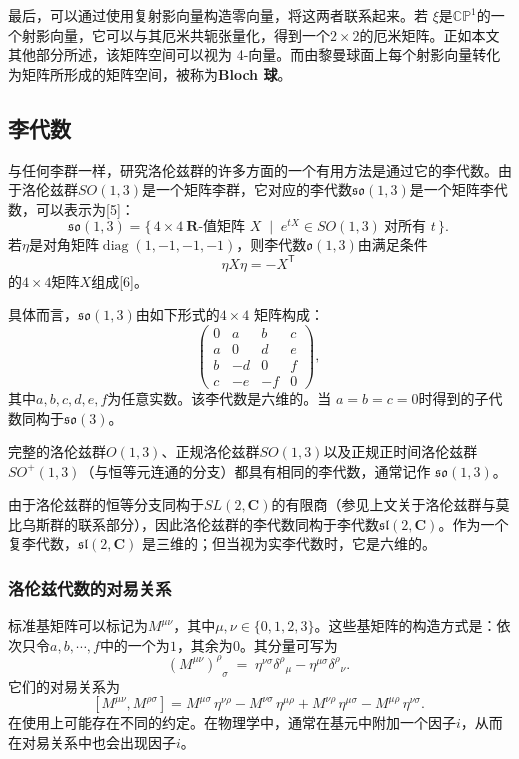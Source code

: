 最后，可以通过使用复射影向量构造零向量，将这两者联系起来。若 $\xi$是$\mathbb{CP}^{1}$的一个射影向量，它可以与其厄米共轭张量化，得到一个$2 \times 2$的厄米矩阵。正如本文其他部分所述，该矩阵空间可以视为 4-向量。而由黎曼球面上每个射影向量转化为矩阵所形成的矩阵空间，被称为\textbf{Bloch 球}。
\subsection{李代数}
与任何李群一样，研究洛伦兹群的许多方面的一个有用方法是通过它的李代数。由于洛伦兹群$SO(1,3)$是一个矩阵李群，它对应的李代数$\mathfrak{so}(1,3)$是一个矩阵李代数，可以表示为[5]：
\[
\mathfrak{so}(1,3) = \{\, 4\times 4 \ \mathbf{R}\text{-值矩阵 } X \;\mid\; e^{tX} \in SO(1,3) \ \text{对所有 } t \,\}.~
\]
若$\eta$是对角矩阵$\operatorname{diag}(1,-1,-1,-1)$，则李代数$\mathfrak{o}(1,3)$由满足条件
\[
\eta X \eta = -X^{\textsf{T}}~
\]
的$4 \times 4$矩阵$X$组成[6]。

具体而言，$\mathfrak{so}(1,3)$由如下形式的$4\times 4$ 矩阵构成：
\[
\begin{pmatrix}
0 & a & b & c \\
a & 0 & d & e \\
b & -d & 0 & f \\
c & -e & -f & 0
\end{pmatrix},~
\]
其中$a,b,c,d,e,f$为任意实数。该李代数是六维的。当 $a=b=c=0$时得到的子代数同构于$\mathfrak{so}(3)$。

完整的洛伦兹群$O(1,3)$、正规洛伦兹群$SO(1,3)$以及正规正时间洛伦兹群$SO^{+}(1,3)$（与恒等元连通的分支）都具有相同的李代数，通常记作 $\mathfrak{so}(1,3)$。

由于洛伦兹群的恒等分支同构于$SL(2,\mathbf{C})$的有限商（参见上文关于洛伦兹群与莫比乌斯群的联系部分），因此洛伦兹群的李代数同构于李代数$\mathfrak{sl}(2,\mathbf{C})$。作为一个复李代数，$\mathfrak{sl}(2,\mathbf{C})$ 是三维的；但当视为实李代数时，它是六维的。
\subsubsection{洛伦兹代数的对易关系}
标准基矩阵可以标记为$M^{\mu \nu}$，其中$\mu,\nu \in \{0,1,2,3\}$。这些基矩阵的构造方式是：依次只令$a,b,\cdots,f$中的一个为$1$，其余为$0$。其分量可写为
\[
{(M^{\mu \nu})^{\rho}}_{\sigma} \;=\; \eta^{\nu \sigma} {\delta^{\rho}}_{\mu} - \eta^{\mu \sigma} {\delta^{\rho}}_{\nu}.~
\]
它们的对易关系为
\[
[M^{\mu \nu}, M^{\rho \sigma}] 
= M^{\mu \sigma}\,\eta^{\nu \rho} 
- M^{\nu \sigma}\,\eta^{\mu \rho} 
+ M^{\nu \rho}\,\eta^{\mu \sigma} 
- M^{\mu \rho}\,\eta^{\nu \sigma}.~
\]
在使用上可能存在不同的约定。在物理学中，通常在基元中附加一个因子$i$，从而在对易关系中也会出现因子$i$。

